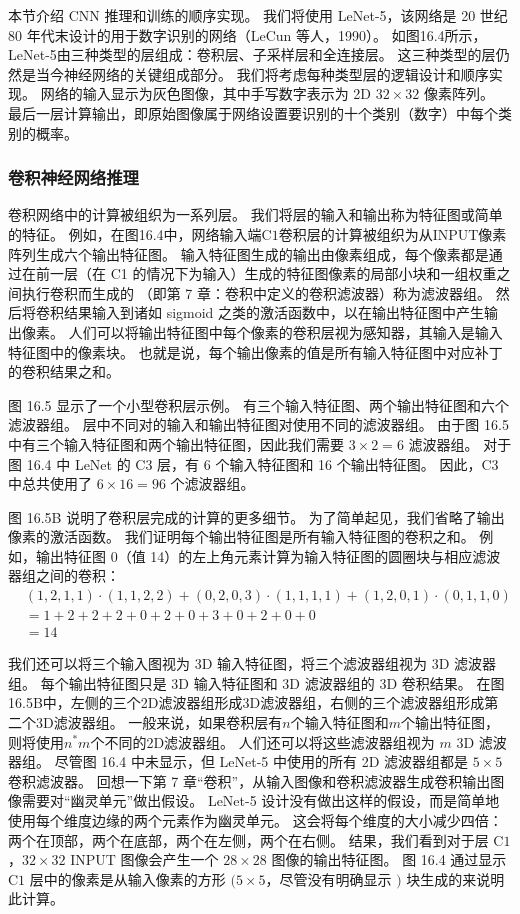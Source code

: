 本节介绍 CNN 推理和训练的顺序实现。 
我们将使用 LeNet-5，该网络是 20 世纪 80 年代末设计的用于数字识别的网络（LeCun 等人，1990）。 
如图16.4所示，LeNet-5由三种类型的层组成：卷积层、子采样层和全连接层。 这三种类型的层仍然是当今神经网络的关键组成部分。 
我们将考虑每种类型层的逻辑设计和顺序实现。 网络的输入显示为灰色图像，其中手写数字表示为 2D $32 \times 32$ 像素阵列。 
最后一层计算输出，即原始图像属于网络设置要识别的十个类别（数字）中每个类别的概率。

\subsubsection{卷积神经网络推理}
卷积网络中的计算被组织为一系列层。 我们将层的输入和输出称为特征图或简单的特征。 
例如，在图16.4中，网络输入端$\mathrm{C} 1$卷积层的计算被组织为从INPUT像素阵列生成六个输出特征图。 
输入特征图生成的输出由像素组成，每个像素都是通过在前一层（在 C1 的情况下为输入）生成的特征图像素的局部小块和一组权重之间执行卷积而生成的 （即第 7 章：卷积中定义的卷积滤波器）称为滤波器组。 
然后将卷积结果输入到诸如 sigmoid 之类的激活函数中，以在输出特征图中产生输出像素。 
人们可以将输出特征图中每个像素的卷积层视为感知器，其输入是输入特征图中的像素块。 
也就是说，每个输出像素的值是所有输入特征图中对应补丁的卷积结果之和。

图 16.5 显示了一个小型卷积层示例。 有三个输入特征图、两个输出特征图和六个滤波器组。 
层中不同对的输入和输出特征图对使用不同的滤波器组。 
由于图 16.5 中有三个输入特征图和两个输出特征图，因此我们需要 $3 \times 2=6$ 滤波器组。 
对于图 16.4 中 LeNet 的 C3 层，有 6 个输入特征图和 16 个输出特征图。 
因此，$\mathrm{C} 3$ 中总共使用了 $6 \times 16=96$ 个滤波器组。

图 16.5B 说明了卷积层完成的计算的更多细节。 为了简单起见，我们省略了输出像素的激活函数。 
我们证明每个输出特征图是所有输入特征图的卷积之和。 
例如，输出特征图 0（值 14）的左上角元素计算为输入特征图的圆圈块与相应滤波器组之间的卷积：
$$
\begin{aligned}
& (1,2,1,1) \cdot(1,1,2,2)+(0,2,0,3) \cdot(1,1,1,1)+(1,2,0, 1) \cdot(0,1,1,0) \\
& =1+2+2+2+0+2+0+3+0+2+0+0 \\
&=14
\end{aligned}
$$

我们还可以将三个输入图视为 3D 输入特征图，将三个滤波器组视为 3D 滤波器组。 
每个输出特征图只是 $3 \mathrm{D}$ 输入特征图和 $3 \mathrm{D}$ 滤波器组的 3D 卷积结果。 
在图16.5B中，左侧的三个2D滤波器组形成3D滤波器组，右侧的三个滤波器组形成第二个3D滤波器组。 
一般来说，如果卷积层有$n$个输入特征图和$m$个输出特征图，则将使用$n^{*} m$个不同的2D滤波器组。 
人们还可以将这些滤波器组视为 $m$ 3D 滤波器组。 
尽管图 16.4 中未显示，但 LeNet-5 中使用的所有 2D 滤波器组都是 $5 \times 5$ 卷积滤波器。 
回想一下第 7 章“卷积”，从输入图像和卷积滤波器生成卷积输出图像需要对“幽灵单元”做出假设。 
LeNet-5 设计没有做出这样的假设，而是简单地使用每个维度边缘的两个元素作为幽灵单元。 
这会将每个维度的大小减少四倍：两个在顶部，两个在底部，两个在左侧，两个在右侧。 
结果，我们看到对于层 $\mathrm{C} 1$，$32 \times 32$ INPUT 图像会产生一个 $28 \times 28$ 图像的输出特征图。 
图 16.4 通过显示 $\mathrm{C} 1$ 层中的像素是从输入像素的方形 $(5 \times 5$，尽管没有明确显示 $)$ 块生成的来说明此计算。


